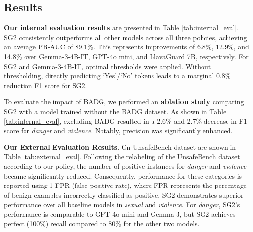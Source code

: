 \subsection{Results}

\textbf{Our internal evaluation results} are presented in Table \ref{tab:internal_eval}. SG2 consistently outperforms all other models across all three policies, achieving an average PR-AUC of 89.1\%. This represents improvements of 6.8\%, 12.9\%, and 14.8\% over Gemma-3-4B-IT, GPT-4o mini, and LlavaGuard 7B, respectively. For SG2 and Gemma-3-4B-IT, optimal thresholds were applied. Without thresholding, directly predicting `Yes'/`No' tokens leads to a marginal 0.8\% reduction F1 score for SG2. 

To evaluate the impact of BADG, we performed an \textbf{ablation study} comparing SG2 with a model trained without the BADG dataset. As shown in Table \ref{tab:internal_eval}, excluding BADG resulted in a 2.6\% and 2.7\% decrease in F1 score for \textit{danger} and \textit{violence}. Notably, precision was significantly enhanced.

\textbf{Our External Evaluation Results}. On UnsafeBench dataset are shown in Table \ref{tab:external_eval}. Following the relabeling of the UnsafeBench dataset according to our policy, the number of positive instances for \textit{danger} and \textit{violence} became significantly reduced. Consequently, performance for these categories is reported using 1-FPR (false positive rate), where FPR represents the percentage of benign examples incorrectly classified as positive. SG2 demonstrates superior performance over all baseline models in \textit{sexual} and \textit{violence}. For \textit{danger}, SG2's performance is comparable to GPT-4o mini and Gemma 3, but SG2 achieves perfect (100\%) recall compared to 80\% for the other two models.
